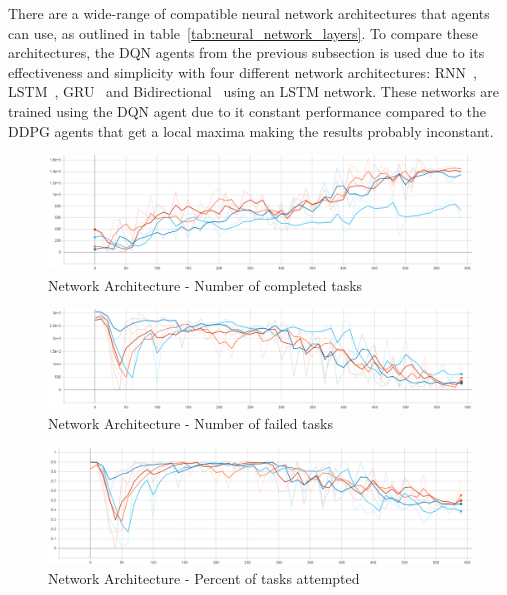 There are a wide-range of compatible neural network architectures that agents can use, as outlined in
table~\ref{tab:neural_network_layers}. To compare these architectures, the DQN agents from the previous subsection is
used due to its effectiveness and simplicity with four different network architectures: RNN~\citep{RNN},
LSTM~\citep{LSTM}, GRU~\citep{GRU} and Bidirectional~\citep{Bidirectional} using an LSTM network. These networks are
trained using the DQN agent due to it constant performance compared to the DDPG agents that get a local maxima making
the results probably inconstant. \\

\begin{figure}[H]
    \centering
    \includegraphics[width=\linewidth]{figures/5_evaluation_figs/net_arch_training_fig/num_completed_tasks.PNG}
    \caption{Network Architecture - Number of completed tasks}
    \label{fig:net_arch_num_completed_tasks}
\end{figure}

\begin{figure}[H]
    \centering
    \includegraphics[width=\linewidth]{figures/5_evaluation_figs/net_arch_training_fig/num_failed_tasks.png}
    \caption{Network Architecture - Number of failed tasks}
    \label{fig:net_arch_num_failed_tasks}
\end{figure}

\begin{figure}[H]
    \centering
    \includegraphics[width=\linewidth]{figures/5_evaluation_figs/net_arch_training_fig/percent_tasks.png}
    \caption{Network Architecture - Percent of tasks attempted}
    \label{fig:net_arch_percent_tasks}
\end{figure}

